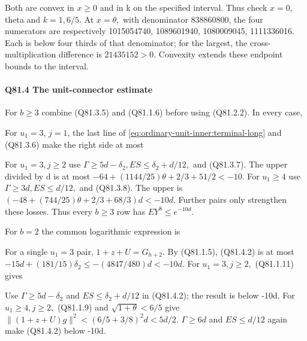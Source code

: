 Both are convex in \(x\ge 0\) and in k on the specified interval.
Thus check \(x=0,\allowbreak \) theta and \(k=1,\allowbreak  6/5.\) At \(x=\theta,\allowbreak \) with denominator
838860800, the four numerators are respectively
1015054740, 1089601940, 1080009045, 1111336016.
Each is below four thirds of that denominator; for the largest,
the cross-multiplication difference is \(21435152>0.\)
Convexity extends these endpoint bounds to the interval.

\paragraph{Q81.4 The unit-connector estimate}\label{part:Q81:unit-estimate}

For \(b\ge 3\) combine (Q81.3.5) and (Q81.1.6) before using (Q81.2.2). In every case,


For \(u_1=3\), \(j=1\), the last line of \eqref{eq:ordinary-unit-inner:terminal-long} and (Q81.3.6) make the right side at most


For \(u_{1}=3,\allowbreak  j\ge 2\) use \(\Gamma\ge 5d-\delta_2,\allowbreak  ES\le \delta_2+d/12,\allowbreak \) and (Q81.3.7).
The upper divided by d is at most
\(-64+(1144/25)\theta+2/3+51/2<-10\).
For \(u_{1}\ge 4\) use \(\Gamma\ge 3d,\allowbreak  ES\le d/12,\allowbreak \) and (Q81.3.8). The upper is
\((-48+(744/25)\theta+2/3+68/3)d<-10d\).
Further pairs only strengthen these losses. Thus every \(b\ge 3\) row
has \(EY^8\le e^{-10d}\).

For \(b=2\) the common logarithmic expression is


For a single \(u_{1}=3\) pair, \(1+z+U=G_{h+2}\). By (Q81.1.5), (Q81.4.2) is at most
\(-15d+(181/15)\delta_2\le-(4847/480)d<-10d\).
For \(u_{1}=3,\allowbreak  j\ge 2,\allowbreak \) (Q81.1.11) gives


Use \(\Gamma\ge 5d-\delta_2\) and \(ES\le \delta_2+d/12\) in (Q81.4.2); the result is below -10d.
For \(u_{1}\ge 4,\allowbreak  j\ge 2,\allowbreak \) (Q81.1.9) and \(\sqrt{1+\theta}<6/5\) give
\(\|(1+z+U)g\|^2<(6/5+3/8)^2d<5d/2\).
\(\Gamma\ge 6d\) and \(ES\le d/12\) again make (Q81.4.2) below -10d.


